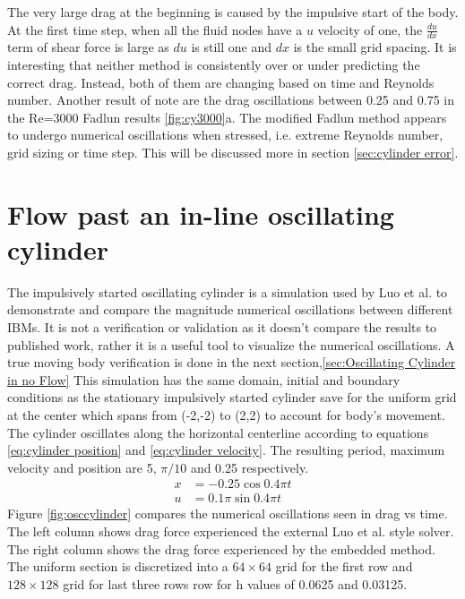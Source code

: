 \documentclass[onehalf,11pt]{beavtex}
\begin{document}
The very large drag at the beginning is caused by the impulsive start of the body.
At the first time step, when all the fluid nodes have a $u$ velocity of one, the $\frac{du}{dx}$ term of shear force is large as $du$ is still one and $dx$ is the small grid spacing.
It is interesting that neither method is consistently over or under predicting the correct drag.
Instead, both of them are changing based on time and Reynolds number.
Another result of note are the drag oscillations between 0.25 and 0.75 in the Re=3000 Fadlun results \ref{fig:cy3000}a.
The modified Fadlun method appears to undergo numerical oscillations when stressed, i.e. extreme Reynolds number, grid sizing or time step. 
This will be discussed more in section \ref{sec:cylinder error}.

\section{Flow past an in-line oscillating cylinder}
\label{sec:osccylinder}
The impulsively started oscillating cylinder is a simulation used by Luo et al\cite{Luo:2012gx}. to demonstrate and compare the magnitude numerical oscillations between different IBMs.
It is not a verification or validation as it doesn't compare the results to published work, rather it is a useful tool to visualize the numerical oscillations.
A true moving body verification is done in the next section,\ref{sec:Oscillating Cylinder in no Flow}
This simulation has the same domain, initial and boundary conditions as the stationary impulsively started cylinder save for the uniform grid at the center which spans from (-2,-2) to (2,2) to account for body's movement.
The cylinder oscillates along the horizontal centerline according to equations \eqref{eq:cylinder position} and \eqref{eq:cylinder velocity}.
The resulting period, maximum velocity and position are 5, $\pi/10$ and 0.25 respectively.
\begin{align}
x&=-0.25\cos{0.4\pi t}\label{eq:cylinder position}\\
u&=0.1\pi\sin{0.4\pi t}\;\label{eq:cylinder velocity}
\end{align}
Figure \ref{fig:osccylinder} compares the numerical oscillations seen in drag vs time. 
The left column shows drag force experienced the external Luo et al. style solver.
The right column shows the drag force experienced by the embedded method.
The uniform section is discretized into a $64 \times 64$ grid for the first row and $ 128 \times 128$ grid for last three rows row for h values of 0.0625 and 0.03125.
\end{document}
